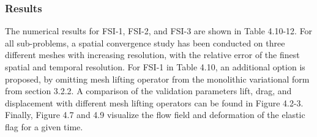 \subsubsection*{Results}
The numerical results for FSI-1, FSI-2, and FSI-3  are shown in Table 4.10-12. For all sub-problems, a spatial convergence study has been conducted on three different meshes with increasing resolution, with the relative error of the finest spatial and temporal resolution. For FSI-1 in Table 4.10, an additional option is proposed, by omitting mesh lifting operator from the monolithic variational form from section 3.2.2.  A comparison of the validation parameters lift, drag, and displacement with different mesh lifting operators can be found in Figure 4.2-3. Finally, Figure 4.7 and 4.9 visualize the flow field and deformation of the elastic flag for a given time.
 
 \newpage
